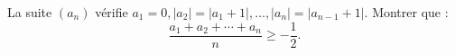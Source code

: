 La suite $(a_n)$ vérifie $a_1 = 0, |a_2| = |a_1 + 1|, \ldots, |a_n| = |a_{n-1} + 1|$. Montrer que :
\[
\frac{a_1 + a_2 + \cdots + a_n}{n} \geq -\frac{1}{2}.
\]
